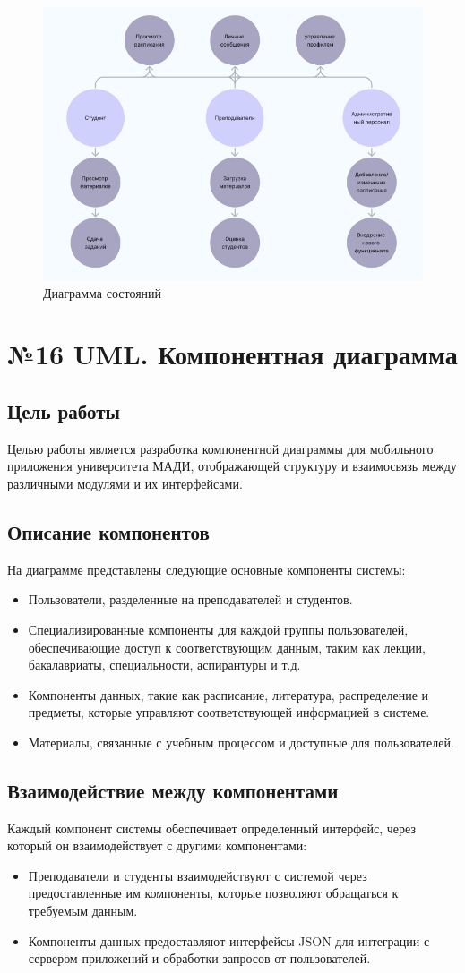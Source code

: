 \documentclass[a4paper,12pt]{article}
\begin{document}
\begin{figure}[-h]
    \centering
    \includegraphics[width=0.5\linewidth]{15UML.png}
    \caption{Диаграмма состояний}
\end{figure}

\section{№16 UML. Компонентная диаграмма}

\subsection{Цель работы}
Целью работы является разработка компонентной диаграммы для мобильного приложения университета МАДИ, отображающей структуру и взаимосвязь между различными модулями и их интерфейсами.

\subsection{Описание компонентов}
На диаграмме представлены следующие основные компоненты системы:
\begin{itemize}
  \item Пользователи, разделенные на преподавателей и студентов.
  \item Специализированные компоненты для каждой группы пользователей, обеспечивающие доступ к соответствующим данным, таким как лекции, бакалавриаты, специальности, аспирантуры и т.д.
  \item Компоненты данных, такие как расписание, литература, распределение и предметы, которые управляют соответствующей информацией в системе.
  \item Материалы, связанные с учебным процессом и доступные для пользователей.
\end{itemize}

\subsection{Взаимодействие между компонентами}
Каждый компонент системы обеспечивает определенный интерфейс, через который он взаимодействует с другими компонентами:
\begin{itemize}
  \item Преподаватели и студенты взаимодействуют с системой через предоставленные им компоненты, которые позволяют обращаться к требуемым данным.
  \item Компоненты данных предоставляют интерфейсы JSON для интеграции с сервером приложений и обработки запросов от пользователей.
\end{itemize}
\end{document}
